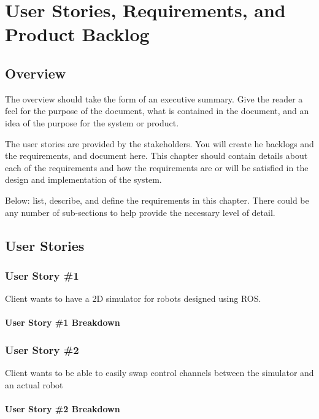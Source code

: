
\chapter{User Stories,  Requirements, and Product Backlog}
\section{Overview}


The overview should take the form of an executive summary.  Give the reader a feel 
for the purpose of the document, what is contained in the document, and an idea 
of the purpose for the system or product. 

 The user stories 
are provided by the stakeholders.  You will create he backlogs and the requirements, and document here.  
This chapter should contain 
details about each of the requirements and how the requirements are or will be 
satisfied in the design and implementation of the system.

Below:   list, describe, and define the requirements in this chapter.  
There could be any number of sub-sections to help provide the necessary level of 
detail. 




\section{User Stories}
\subsection{User Story \#1}
Client wants to have a 2D simulator for robots designed using ROS.

\subsubsection{User Story \#1 Breakdown}

\subsection{User Story \#2} 
Client wants to be able to easily swap control channels between the simulator and an actual robot

\subsubsection{User Story \#2 Breakdown}

